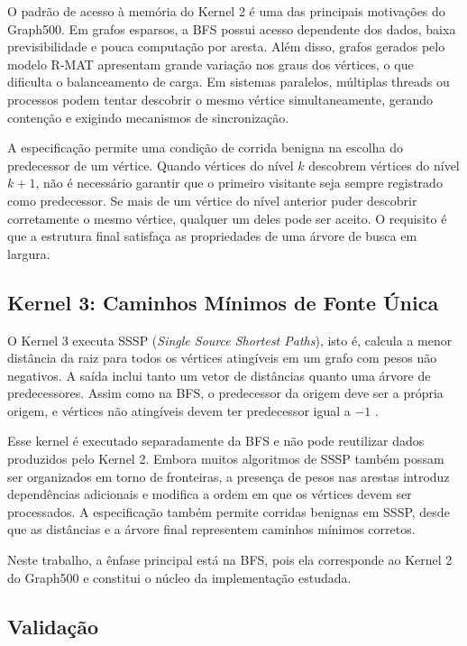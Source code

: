 O padrão de acesso à memória do Kernel 2 é uma das principais motivações do Graph500. Em grafos esparsos, a BFS possui acesso dependente dos dados, baixa previsibilidade e pouca computação por aresta. Além disso, grafos gerados pelo modelo R-MAT apresentam grande variação nos graus dos vértices, o que dificulta o balanceamento de carga. 
Em sistemas paralelos, múltiplas threads ou processos podem tentar descobrir o mesmo vértice simultaneamente, gerando contenção e exigindo mecanismos de sincronização.

A especificação permite uma condição de corrida benigna na escolha do predecessor de um vértice. Quando vértices do nível $k$ descobrem vértices do nível $k+1$, não é necessário garantir que o primeiro visitante seja sempre registrado como predecessor. Se mais de um vértice do nível anterior puder descobrir corretamente o mesmo vértice, qualquer um deles pode ser aceito. O requisito é que a estrutura final satisfaça as propriedades de uma árvore de busca em largura.

\subsection{Kernel 3: Caminhos Mínimos de Fonte Única}
\label{sec:graph500-kernel3}

O Kernel 3 executa SSSP (\textit{Single Source Shortest Paths}), isto é, calcula a menor distância da raiz para todos os vértices atingíveis em um grafo com pesos não negativos. A saída inclui tanto um vetor de distâncias quanto uma árvore de predecessores. Assim como na BFS, o predecessor da origem deve ser a própria origem, e vértices não atingíveis devem ter predecessor igual a $-1$ \cite{graph500spec, cormenalgorithms}.

Esse kernel é executado separadamente da BFS e não pode reutilizar dados produzidos pelo Kernel 2. Embora muitos algoritmos de SSSP também possam ser organizados em torno de fronteiras, a presença de pesos nas arestas introduz dependências adicionais e modifica a ordem em que os vértices devem ser processados. A especificação também permite corridas benignas em SSSP, desde que as distâncias e a árvore final representem caminhos mínimos corretos.

Neste trabalho, a ênfase principal está na BFS, pois ela corresponde ao Kernel 2 do Graph500 e constitui o núcleo da implementação estudada.

\subsection{Validação}
\label{sec:graph500-validacao}

